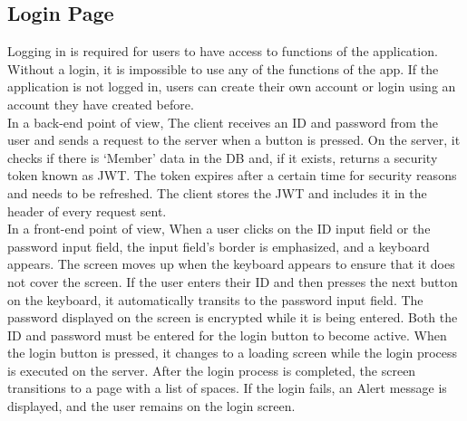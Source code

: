\documentclass[conference]{IEEEtran}
\begin{document}
    \subsection{Login Page}
        Logging in is required for users to have access to functions of the application. Without a login, it is impossible to use any of the functions of the app. If the application is not logged in, users can create their own account or login using an account they have created before. \\
        In a back-end point of view, The client receives an ID and password from the user and sends a request to the server when a button is pressed. On the server, it checks if there is ‘Member’ data in the DB and, if it exists, returns a security token known as JWT. The token expires after a certain time for security reasons and needs to be refreshed.  The client stores the JWT and includes it in the header of every request sent. \\
        In a front-end point of view, When a user clicks on the ID input field or the password input field, the input field's border is emphasized, and a keyboard appears. The screen moves up when the keyboard appears to ensure that it does not cover the screen.  If the user enters their ID and then presses the next button on the keyboard, it automatically transits to the password input field. The password displayed on the screen is encrypted while it is being entered.  Both the ID and password must be entered for the login button to become active. When the login button is pressed, it changes to a loading screen while the login process is executed on the server. After the login process is completed, the screen transitions to a page with a list of spaces. If the login fails, an Alert message is displayed, and the user remains on the login screen.
\end{document}

